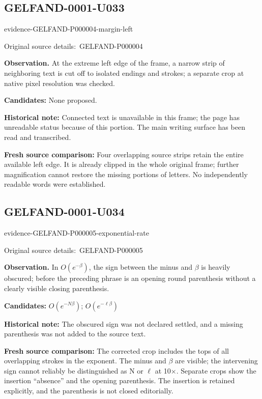 \documentclass[11pt]{article}
\newcommand{\EvidenceBlock}[4]{%
 \par\smallskip\noindent\begin{minipage}{\linewidth}
 \begin{minipage}[t]{.47\linewidth}\vspace{0pt}\centering
 \csname evidence-#1-#2\endcsname\par
 {\scriptsize\SourceCropCaption\ #1}\par
 \end{minipage}\hfill
 \begin{minipage}[t]{.49\linewidth}\vspace{0pt}\raggedright
 {\small\color{orange!65!black}\textbf{#4} #3}\par
 \end{minipage}
 \end{minipage}\par\smallskip}
\newcommand{\SourceCropCaption}{Original source details:}\newcommand{\ReadingCaption}{Uncertain reading.}\newcommand{\IncompleteCaption}{Undeciphered passage.}\newcommand{\DiagramCaption}{Diagram and typed description.}
\begin{document}
\subsection*{GELFAND-0001-U033}
\EvidenceBlock{GELFAND-P000004}{margin-left}{At the extreme left edge of the frame, a narrow strip of neighboring text is cut off to isolated endings and strokes; a separate crop at native pixel resolution was checked.}{Observation.}
\par\smallskip\noindent\textbf{Candidates: } None proposed.\par
\par\smallskip\noindent\textbf{Historical note: } Connected text is unavailable in this frame; the page has unreadable status because of this portion. The main writing surface has been read and transcribed.\par
\par\smallskip\noindent\textbf{Fresh source comparison: } Four overlapping source strips retain the entire available left edge. It is already clipped in the whole original frame; further magnification cannot restore the missing portions of letters. No independently readable words were established.\par

\subsection*{GELFAND-0001-U034}
\EvidenceBlock{GELFAND-P000005}{exponential-rate}{In \(O(e^{\cdots\beta})\), the sign between the minus and \(\beta\) is heavily obscured; before the preceding phrase is an opening round parenthesis without a clearly visible closing parenthesis.}{Observation.}
\par\smallskip\noindent\textbf{Candidates: } \(O(e^{-N\beta})\); \(O(e^{-\ell\beta})\)\par
\par\smallskip\noindent\textbf{Historical note: } The obscured sign was not declared settled, and a missing parenthesis was not added to the source text.\par
\par\smallskip\noindent\textbf{Fresh source comparison: } The corrected crop includes the tops of all overlapping strokes in the exponent. The minus and \(\beta\) are visible; the intervening sign cannot reliably be distinguished as N or \(\ell\) at 10×. Separate crops show the insertion “absence” and the opening parenthesis. The insertion is retained explicitly, and the parenthesis is not closed editorially.\par
\end{document}
